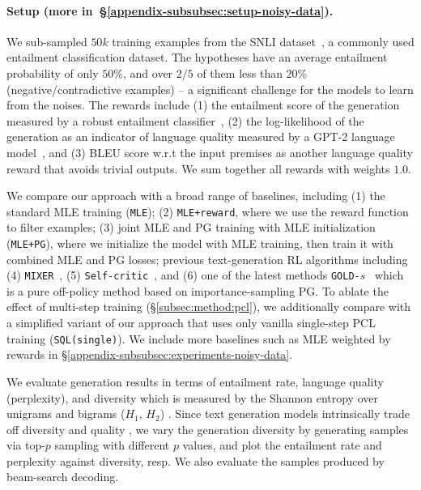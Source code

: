 \paragraph{Setup (more in~\S\ref{appendix-subsubsec:setup-noisy-data}).}
We sub-sampled $50k$ training examples from the SNLI dataset~\citep{bowman2015large}, a commonly used entailment classification dataset. The hypotheses have an average entailment probability of only $50\%$, and over $2/5$ of them less than $20\%$ (negative/contradictive examples) -- a significant challenge for the models to learn from the noises. 
The rewards include (1) the entailment score of the generation measured by a robust entailment classifier~\citep{nie2020adversarial}, (2) the log-likelihood of the generation as an indicator of language quality measured by a GPT-2 language model~\citep{radford2019language}, and (3) BLEU score w.r.t the input premises as another language quality reward that avoids trivial outputs. We sum together all rewards with weights $1.0$.

We compare our approach with a broad range of baselines, including 
(1) the standard MLE training (\texttt{MLE}); 
(2) \texttt{MLE+reward}, where we use the reward function to filter examples;
(3) joint MLE and PG training with MLE initialization (\texttt{MLE+PG}), where we initialize the model with MLE training, then train it with combined MLE and PG losses;
previous text-generation RL algorithms including (4) \texttt{MIXER}~\citep{ranzato2015sequence}, 
(5) \texttt{Self-critic}~\citep{rennie2017self}, 
and 
(6) one of the latest methods \texttt{GOLD-$s$}~\citep{pang2021text} which is a pure off-policy method based on importance-sampling PG. 
To ablate the effect of multi-step training (\S\ref{subsec:method:pcl}), we additionally compare with a simplified variant of our approach that uses only vanilla single-step PCL training (\texttt{SQL(single)}). We include more baselines such as MLE weighted by rewards in \S\ref{appendix-subsubsec:experiments-noisy-data}.




We evaluate generation results in terms of entailment rate, language quality (perplexity), and diversity which is measured by the Shannon entropy over unigrams and bigrams ($H_1$, $H_2$) \citep{gehrmann2021gem}. Since text generation models intrinsically
trade off diversity and quality \citep{caccia2019language,hashimoto2019unifying}, we vary the generation diversity by generating samples via top-$p$ sampling \citep{holtzman2019curious} with different $p$ values, and plot the entailment rate and perplexity against diversity, resp. We also evaluate the samples produced by beam-search decoding.


